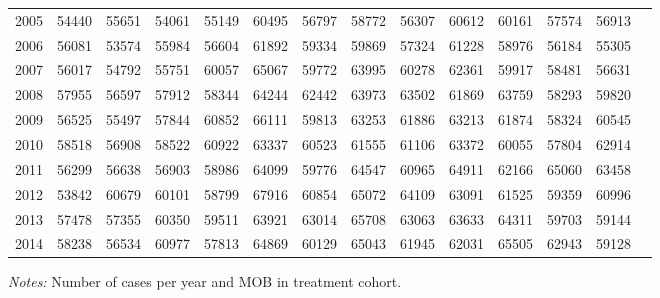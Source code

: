 \begin{table}[H]
\begin{threeparttable}
{\begin{tabular}{l*{13}{c}}
2005        &       54440&       55651&       54061&       55149&       60495&       56797&       58772&       56307&       60612&       60161&       57574&       56913\\
2006        &       56081&       53574&       55984&       56604&       61892&       59334&       59869&       57324&       61228&       58976&       56184&       55305\\
2007        &       56017&       54792&       55751&       60057&       65067&       59772&       63995&       60278&       62361&       59917&       58481&       56631\\
2008        &       57955&       56597&       57912&       58344&       64244&       62442&       63973&       63502&       61869&       63759&       58293&       59820\\
2009        &       56525&       55497&       57844&       60852&       66111&       59813&       63253&       61886&       63213&       61874&       58324&       60545\\
2010        &       58518&       56908&       58522&       60922&       63337&       60523&       61555&       61106&       63372&       60055&       57804&       62914\\
2011        &       56299&       56638&       56903&       58986&       64099&       59776&       64547&       60965&       64911&       62166&       65060&       63458\\
2012        &       53842&       60679&       60101&       58799&       67916&       60854&       65072&       64109&       63091&       61525&       59359&       60996\\
2013        &       57478&       57355&       60350&       59511&       63921&       63014&       65708&       63063&       63633&       64311&       59703&       59144\\
2014        &       58238&       56534&       60977&       57813&       64869&       60129&       65043&       61945&       62031&       65505&       62943&       59128\\
 \bottomrule \end{tabular} } \begin{tablenotes} \item \scriptsize \emph{Notes:} Number of cases per year and MOB in treatment cohort. \end{tablenotes} \end{threeparttable} \end{table} 
